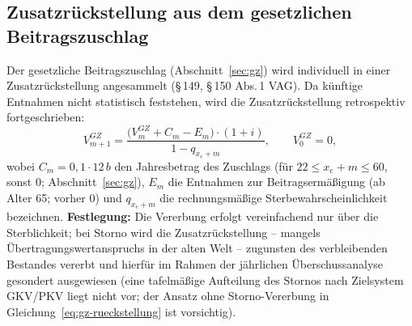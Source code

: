 \subsection{Zusatzrückstellung aus dem gesetzlichen Beitragszuschlag}
\label{sec:zusatzrueckstellung}

Der gesetzliche Beitragszuschlag (Abschnitt~\ref{sec:gz}) wird
individuell in einer Zusatzrückstellung angesammelt (\S\,149, \S\,150
Abs.\,1 VAG). Da künftige Entnahmen nicht statistisch feststehen, wird
die Zusatzrückstellung retrospektiv fortgeschrieben:
\begin{equation}
V^{GZ}_{m+1}
= \frac{\bigl(V^{GZ}_{m} + C_m - E_m\bigr)\cdot(1+i)}{1-q_{x_e+m}},
\qquad V^{GZ}_{0} = 0,
\label{eq:gz-rueckstellung}
\end{equation}
wobei $C_m = 0{,}1\cdot 12\,b$ den Jahresbetrag des Zuschlags
(für $22 \le x_e+m \le 60$, sonst 0; Abschnitt~\ref{sec:gz}), $E_m$
die Entnahmen zur Beitragsermäßigung (ab Alter 65; vorher 0) und
$q_{x_e+m}$ die rechnungsmäßige Sterbewahrscheinlichkeit bezeichnen.
\textbf{Festlegung:} Die Vererbung erfolgt vereinfachend nur über die
Sterblichkeit; bei Storno wird die Zusatzrückstellung -- mangels
Übertragungswertanspruchs in der alten Welt -- zugunsten des
verbleibenden Bestandes vererbt und hierfür im Rahmen der jährlichen
Überschussanalyse gesondert ausgewiesen (eine tafelmäßige Aufteilung
des Stornos nach Zielsystem GKV/PKV liegt nicht vor; der Ansatz ohne
Storno-Vererbung in Gleichung~\eqref{eq:gz-rueckstellung} ist
vorsichtig).

